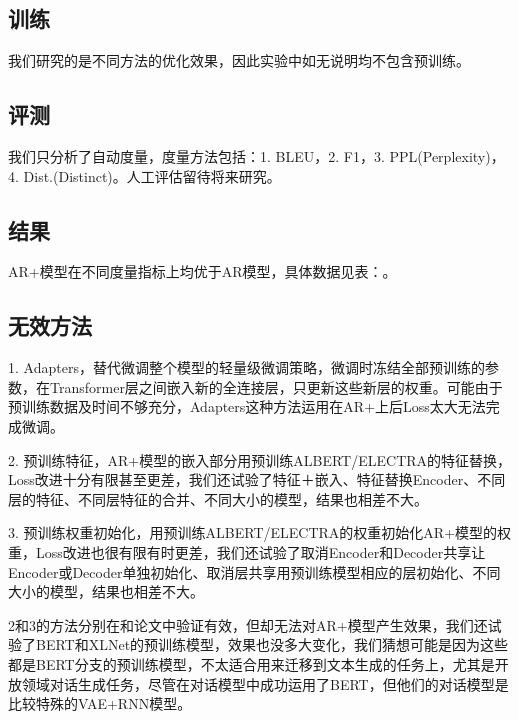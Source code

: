 \documentclass[letterpaper]{article} %
\DeclareRobustCommand{\citeext}[1]{\cite[#1]{#1}}
\begin{document}
\begin{CJK*}{UTF8}{gbsn}
\subsection[Training]{训练}
我们研究的是不同方法的优化效果，因此实验中如无说明均不包含预训练。

\subsection[Evaluation]{评测} 
我们只分析了自动度量，度量方法包括：1. BLEU\citeext{Papineni2002}，2. F1，3. PPL(Perplexity)，4. Dist.(Distinct)\citeext{Li2016}。人工评估留待将来研究。

\subsection[Result]{结果} 
AR+模型在不同度量指标上均优于AR模型，具体数据见表：。


\subsection[Ineffective Methods]{无效方法} 
1. Adapters\citeext{Houlsby2019}，替代微调整个模型的轻量级微调策略，微调时冻结全部预训练的参数，在Transformer层之间嵌入新的全连接层，只更新这些新层的权重。可能由于预训练数据及时间不够充分，Adapters这种方法运用在AR+上后Loss太大无法完成微调。

2. 预训练特征\citeext{Devlin2019}，AR+模型的嵌入部分用预训练ALBERT\citeext{Lan2019}/ELECTRA\citeext{Clark2020}的特征替换，Loss改进十分有限甚至更差，我们还试验了特征＋嵌入、特征替换Encoder、不同层的特征、不同层特征的合并、不同大小的模型，结果也相差不大。

3. 预训练权重初始化\citeext{Ziegler2019}，用预训练ALBERT/ELECTRA的权重初始化AR+模型的权重，Loss改进也很有限有时更差，我们还试验了取消Encoder和Decoder共享让Encoder或Decoder单独初始化、取消层共享用预训练模型相应的层初始化、不同大小的模型，结果也相差不大。

2和3的方法分别在\citeext{Devlin2019}和\citeext{Zhao2019}论文中验证有效，但却无法对AR+模型产生效果，我们还试验了BERT和XLNet\citeext{Yang2019}的预训练模型，效果也没多大变化，我们猜想可能是因为这些都是BERT分支的预训练模型，不太适合用来迁移到文本生成的任务上，尤其是开放领域对话生成任务，尽管\citeext{Zhao2019}在对话模型中成功运用了BERT，但他们的对话模型是比较特殊的VAE+RNN模型。


\end{CJK*}
\end{document}
